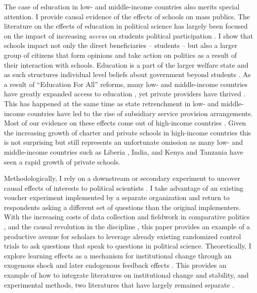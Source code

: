 \documentclass[hidelinks, 12pt, titlepage]{article}
\begin{document}
    The case of education in low- and middle-income countries also merits special attention. I provide causal evidence of the effects of schools on mass publics.  The literature on the effects of education in political science has largely been focused on the impact of increasing \emph{access} on students political participation \citep{Croke2016,Dee2004, Marshall2016, Marshall2019,Mettler2005,Rose2018,Wantchekon2013}. I show that schools impact not only the direct beneficiaries -- students -- but also a larger group of citizens that form opinions and take action on politics as a result of their interaction with schools. Education is a part of the larger welfare state and as such structures individual level beliefs about government beyond students \citep{Kumlin2004}.  As a result of ``Education For All'' reforms, many low- and middle-income countries have greatly expanded access to education \citep{Bold2015,Pritchett2013a}, yet private providers have thrived \citep{Post2018}.  This has happened at the same time as state retrenchment in low- and middle-income countries have led to the rise of subsidiary service provision arrangements.  Most of our evidence on these effects come out of high-income countries \citep{Cook2020,DeAngelis2019,Dill2009,Kingsbury2019}.  Given the increasing growth of charter and private schools in high-income countries this is not surprising but still represents an unfortunate omission as many low- and middle-income countries such as Liberia \citep{Romero2020}, India, and Kenya and Tanzania \citep{Bold2015,Lucas2012} have seen a rapid growth of private schools.

	Methodologically, I rely on a downstream or secondary experiment to uncover causal effects of interests to political scientists \citep{Baldwin2011}. I take advantage of an existing voucher experiment implemented by a separate organization and return to respondents asking a different set of questions than the original implementers.  With the increasing costs of data collection and fieldwork in comparative politics \citep{Hsueh2014}, and the causal revolution in the discipline \citep{Humphreys2020}, this paper provides an example of a productive avenue for scholars to leverage already existing randomized control trials to ask questions that speak to questions in political science.  Theoretically, I explore learning effects as a mechanism for institutional change through an exogenous shock and later endogenous feedback effects \citep{Pierson2000b}.  This provides an example of how to integrate literatures on institutional change and stability, and experimental methods, two literatures that have largely remained separate \citep{Steinmo2015}.  
\end{document}
